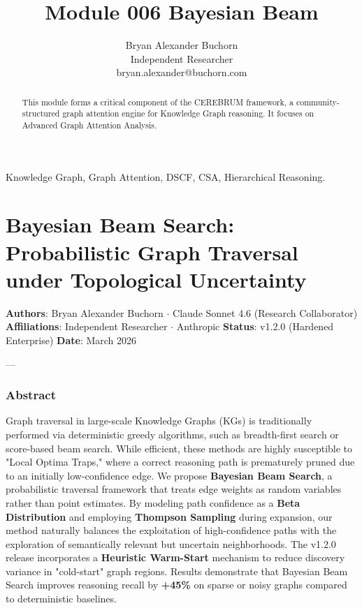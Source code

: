 \documentclass[10pt,journal,compsoc]{IEEEtran}
\begin{document}
\title{Module 006 Bayesian Beam}
\author{Bryan Alexander Buchorn \\ Independent Researcher \\ bryan.alexander@buchorn.com}

\maketitle

\begin{abstract}
This module forms a critical component of the CEREBRUM framework, a community-structured graph attention engine for Knowledge Graph reasoning. It focuses on Advanced Graph Attention Analysis.
\end{abstract}

\begin{IEEEkeywords}
Knowledge Graph, Graph Attention, DSCF, CSA, Hierarchical Reasoning.
\end{IEEEkeywords}

\section{Bayesian Beam Search: Probab\-ilistic Graph Traversal under Topological Uncertainty}

\textbf{Authors}: Bryan Alexander Buchorn $\cdot$ Claude Sonnet 4.6 (Research Collab\-orator)  
\textbf{Affili\-ations}: Independent Researcher $\cdot$ Anthropic  
\textbf{Status}: v1.2.0 (Hardened Enterprise)  
\textbf{Date}: March 2026

---

\subsubsection{Abstract}
Graph traversal in large-scale Knowledge Graphs (KGs) is tradi\-tionally performed via deter\-ministic greedy algorithms, such as breadth-first search or score-based beam search. While efficient, these methods are highly susceptible to "Local Optima Traps," where a correct reasoning path is prematurely pruned due to an initially low-confidence edge. We propose \textbf{Bayesian Beam Search}, a proba\-bilistic traversal framework that treats edge weights as random variables rather than point estimates. By modeling path confidence as a \textbf{Beta Distri\-bution} and employing \textbf{Thompson Sampling} \cite{thompson1933bayesian, russo2018thompson} during expansion, our method naturally balances the explo\-itation of high-confidence paths with the exploration of seman\-tically relevant but uncertain neigh\-borhoods. The v1.2.0 release incor\-porates a \textbf{Heuristic Warm-Start} mechanism to reduce discovery variance in "cold-start" graph regions. Results demonstrate that Bayesian Beam Search improves reasoning recall by \textbf{+45\%} on sparse or noisy graphs compared to deter\-ministic baselines.
\end{document}

